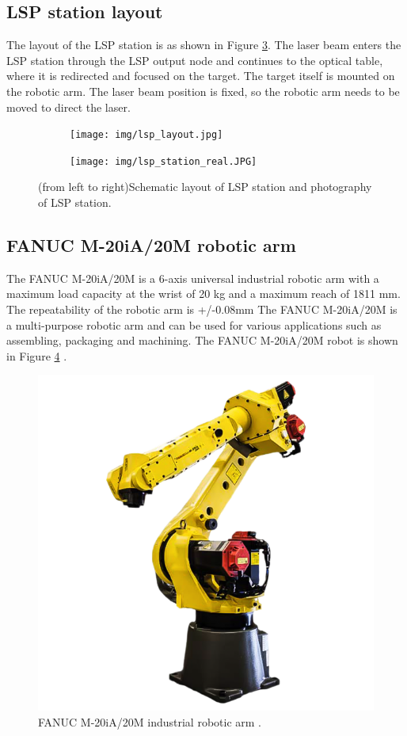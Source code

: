 \subsection{LSP station layout}

The layout of the LSP station is as shown in Figure \ref{fig:lsplayout}. The laser
beam enters the LSP station through the LSP output node and
continues to the optical table, where it is redirected and
focused on the target. The target itself is mounted on the
robotic arm. The laser beam position is fixed, so the robotic
arm needs to be moved to direct the laser.

\begin{figure}[t!]
\centering
\begin{subfigure}{.45\textwidth}

    \texttt{[image: img/lsp\_layout.jpg]}

    \label{fig:a}
\end{subfigure}
\begin{subfigure}{.45\textwidth}

    \texttt{[image: img/lsp\_station\_real.JPG]}

    \label{fig:b}
\end{subfigure}

\caption{(from left to right)Schematic layout of LSP station and photography of LSP station.}
\label{fig:lsplayout}
\end{figure}

\subsection{FANUC M-20iA/20M robotic arm}

The FANUC M-20iA/20M is a 6-axis universal industrial robotic arm with a maximum load capacity at the wrist of 20 kg and a maximum reach of 1811 mm. The repeatability of the robotic arm is +/-0.08mm The FANUC M-20iA/20M is a multi-purpose robotic arm and can be used for various applications such as assembling, packaging and machining. The  FANUC M-20iA/20M robot is shown in Figure \ref{fig:fanucrobot} \cite{fanucrobot}.

\begin{figure}[h]
    \centering
    \includegraphics[width=0.6\linewidth]{img/fanuc_robot.png}
    \caption{FANUC M-20iA/20M industrial robotic arm  \cite{fanucrobot}.}
    \label{fig:fanucrobot}
\end{figure}

